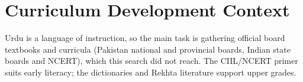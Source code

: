 \documentclass[12pt]{article}
\begin{document}
\section{Curriculum Development Context}
Urdu is a language of instruction, so the main task is gathering official board textbooks and curricula (Pakistan national and provincial boards, Indian state boards and NCERT), which this search did not reach. The CIIL/NCERT primer suits early literacy; the dictionaries and Rekhta literature support upper grades.
\end{document}
